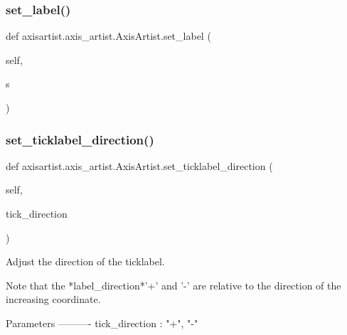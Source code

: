 \subsubsection{\texorpdfstring{set\+\_\+label()}{set\_label()}}
{\footnotesize\ttfamily def axisartist.\+axis\+\_\+artist.\+Axis\+Artist.\+set\+\_\+label (\begin{DoxyParamCaption}\item[{}]{self,  }\item[{}]{s }\end{DoxyParamCaption})}

\mbox{\label{classaxisartist_1_1axis__artist_1_1AxisArtist_a5d206ba6246491f52afc3c542e937e05}} 
\subsubsection{\texorpdfstring{set\+\_\+ticklabel\+\_\+direction()}{set\_ticklabel\_direction()}}
{\footnotesize\ttfamily def axisartist.\+axis\+\_\+artist.\+Axis\+Artist.\+set\+\_\+ticklabel\+\_\+direction (\begin{DoxyParamCaption}\item[{}]{self,  }\item[{}]{tick\+\_\+direction }\end{DoxyParamCaption})}

\begin{DoxyVerb}Adjust the direction of the ticklabel.

Note that the *label_direction*\s '+' and '-' are relative to the
direction of the increasing coordinate.

Parameters
----------
tick_direction : {"+", "-"}
\end{DoxyVerb}
 \mbox{\label{classaxisartist_1_1axis__artist_1_1AxisArtist_a1554b34e483df14a55b0378ae0e4804d}} 
